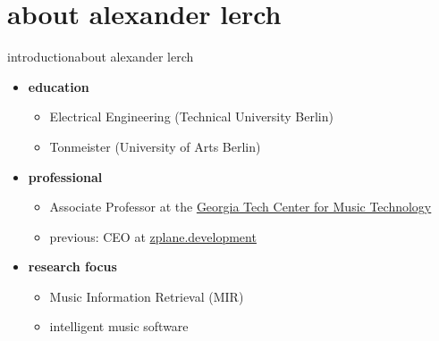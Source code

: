 

\subtitle{Module 0.0: Introduction to the online course}


	

    \section[about]{about alexander lerch}
        \begin{frame}{introduction}{about alexander lerch}
            \begin{itemize}
                \item   \textbf{education}
                    \begin{itemize}
                        \item   Electrical Engineering (Technical University Berlin)
                        \item   Tonmeister (University of Arts Berlin)
                    \end{itemize}
        \smallskip
                \item   \textbf{professional}
                    \begin{itemize}
                        \item   Associate Professor at the \href{http://gtcmt.gatech.edu}{Georgia Tech Center for Music Technology}
                        \item   previous: CEO at \href{http://www.zplane.de}{zplane.development}
                    \end{itemize}
        \smallskip
                \item   \textbf{research focus}
                    \begin{itemize}
                        \item   Music Information Retrieval (MIR)
                        \item   intelligent music software
                    \end{itemize}
            \end{itemize}
            
        \end{frame}

